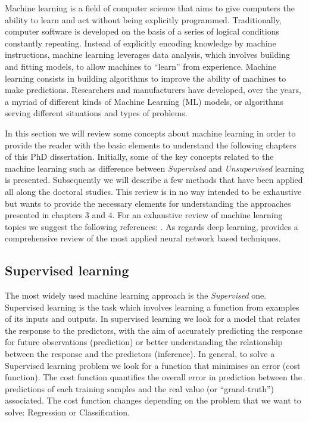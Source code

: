 Machine learning is a field of computer science that aims to give computers the ability to learn and act without being explicitly programmed.  Traditionally, computer software is developed on the basis of a series of logical conditions constantly repeating. Instead of explicitly encoding knowledge by machine instructions, machine learning leverages data analysis, which involves building and fitting models, to allow machines to ``learn'' from experience. Machine learning consists in building algorithms to improve the ability of machines to make predictions. Researchers and manufacturers have developed, over the years, a myriad of different kinds of Machine Learning (ML) models, or algorithms serving different situations and types of problems.

In this section we will review some concepts about machine learning in order to provide the reader with the basic elements to understand the following chapters of this PhD dissertation. Initially, some of the key concepts related to the machine learning such as difference between \textit{Supervised} and \textit{Unsupervised} learning is presented. Subsequently we will describe a few methods that have been applied all along the doctoral studies. This review is in no way intended to be exhaustive but wants to provide the necessary elements for understanding the approaches presented in chapters 3 and 4. For an exhaustive review of machine learning topics we suggest the following references: \citep{bishop2006pattern,friedman2017elements}. As regards deep learning, \citep{goodfellow2016deep} provides a comprehensive review of the most applied neural network based techniques. 


\subsection{Supervised learning}

The most widely used machine learning approach is the \textit{Supervised} one. Supervised learning is the task which involves learning a function from examples of its inputs and outputs. In supervised learning we look for a model that relates the response to the predictors, with the aim of accurately predicting the response for future observations (prediction) or better understanding the relationship between the response and the predictors (inference). In general, to solve a Supervised learning problem we look for a function that minimises an error (cost function). The cost function quantifies the overall error in prediction between the predictions of each training samples and the real value (or “grand-truth”) associated. The cost function changes depending on the problem that we want to solve: Regression or Classification.

